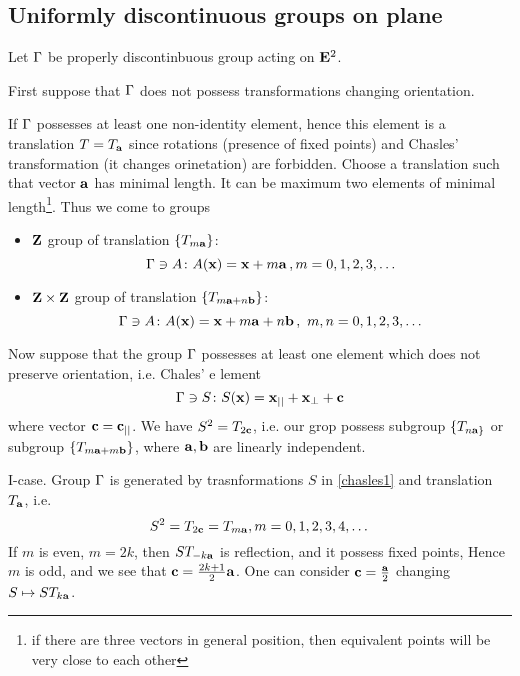 \documentclass[12pt]{article}
\theoremstyle{theorem}
\theoremstyle{lemma}
\numberwithin{equation}{section}
\begin{document}
\subsection {Uniformly discontinuous groups on plane}

  Let ${\Gamma}$ be properly discontinbuous group acting on  ${\bf E}^2$.

First suppose that
 ${\Gamma}$ does not possess transformations changing orientation.

If ${\Gamma}$ possesses at least one non-identity element, hence
this element is a translation $T=T_{\bf a}$ since rotations
(presence of fixed points) and Chasles' transformation
 (it changes  orinetation)
are forbidden.   Choose a translation such that vector ${\bf a}$
has minimal length. It can be maximum two elements of minimal
length\footnote{if there are three vectors in general position,
then equivalent points will be very close to each other}. 
Thus we come to groups

  \begin{itemize}
     \item
   ${\bf Z}$ group of translation $\{T_{m{\bf a}}\}$:
           \begin{equation*}
           {\Gamma}\ni A\colon A({\bf x})={\bf x}+m{\bf a}\,, m=0,1,2,3,\dots
           \end{equation*}
     \item
   ${\bf Z}\times {\bf Z}$ group of translation $\{T_{m{\bf a}+n{\bf b}}\}$:
           \begin{equation*}
           {\Gamma}\ni A\colon A({\bf x})={\bf x}+m{\bf a}+n{\bf b}\,,\,\, m,n=0,1,2,3,
\dots
           \end{equation*}
\end{itemize}

Now suppose that the group ${\Gamma}$ possesses at least one
element which does not preserve orientation, i.e.  Chales' e
lement
           \begin{equation}\label{chasles1}
           {\Gamma}\ni S\colon S({\bf x})={\bf x}_{||}+{\bf x}_\perp+{\bf c }
           \end{equation}
where vector ${\bf c }={\bf c }_{||}$. We have $S^2=T_{2{\bf c }}$,
i.e. our grop possess subgroup $\{T_{n{\bf a}\}}$
or subgroup $\{T_{m{\bf a}+m{\bf b}}\}$, where ${\bf a},{\bf b}$
are linearly independent.

  I-case. Group ${\Gamma}$ is generated by trasnformations
$S$ in \eqref{chasles1}  and translation $T_{{\bf a}}$,
i.e.  
       $$
  S^2=T_{2{\bf c }}=T_{m{\bf a}}, m=0,1,2,3,4,\dots
       $$    
If $m$ is even, $m=2k$, then $ST_{-k{\bf a}}$ is reflection,
and it possess fixed points,
Hence $m$ is odd, and we see that ${\bf c }={2k+1\over 2}{\bf a}$.
One can consider ${\bf c }={{\bf a}\over 2}$ changing $S\mapsto ST_{k{\bf a}}$.
\end{document}
